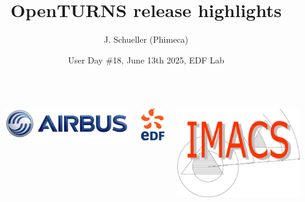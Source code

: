 \documentclass[aspectratio=169]{beamer}
\title[OpenTURNS]{OpenTURNS release highlights}
\author[OpenTURNS et al.]{J. Schueller (Phimeca)}
\date[]{User Day \#18, June 13th 2025, EDF Lab}
\begin{document}

  \begin{frame}
  \titlepage

  \begin{columns}
  \begin{column}[t]{0.05\textwidth}
        \end{column}
  
  \begin{center}
\includegraphics[height=0.04\textheight]{figures/airbus-logo-3d-blue.png}
\end{center}

  \begin{center}
\includegraphics[height=0.09\textheight]{figures/logo-edf.jpg}
\end{center}

  \begin{center}
\includegraphics[height=0.09\textheight]{figures/imacs-logo.jpg}
\end{center}


\end{columns}
\end{frame}
\end{document}
